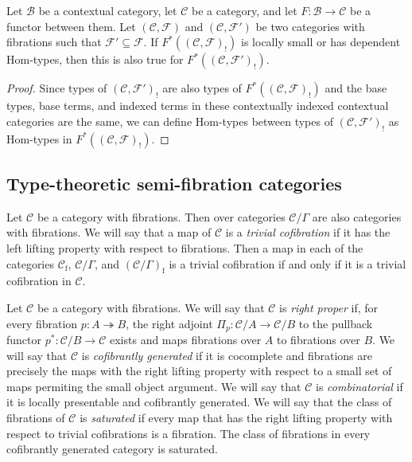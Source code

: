 \documentclass[reqno]{amsart}
\theoremstyle{definition}
\theoremstyle{remark}
\newcommand{\fs}[1]{\mathrm{#1}}
\newcommand{\scat}[1]{\mathcal{#1}}
\newcommand{\Fib}{\mathcal{F}}
\newcommand{\Hom}{\fs{Hom}}
\numberwithin{figure}{section}
\begin{document}
\begin{prop}
Let $\scat{B}$ be a contextual category, let $\scat{C}$ be a category, and let $F : \scat{B} \to \scat{C}$ be a functor between them.
Let $(\scat{C},\Fib)$ and $(\scat{C},\Fib')$ be two categories with fibrations such that $\Fib' \subseteq \Fib$.
If $F^*((\scat{C},\Fib)_!)$ is locally small or has dependent $\Hom$-types, then this is also true for $F^*((\scat{C},\Fib')_!)$.
\end{prop}
\begin{proof}
Since types of $(\scat{C},\Fib')_!$ are also types of $F^*((\scat{C},\Fib)_!)$ and the base types, base terms, and indexed terms in these contextually indexed contextual categories are the same,
we can define $\Hom$-types between types of $(\scat{C},\Fib')_!$ as $\Hom$-types in $F^*((\scat{C},\Fib)_!)$.
\end{proof}

\subsection{Type-theoretic semi-fibration categories}

Let $\scat{C}$ be a category with fibrations.
Then over categories $\scat{C}/\Gamma$ are also categories with fibrations.
We will say that a map of $\scat{C}$ is a \emph{trivial cofibration} if it has the left lifting property with respect to fibrations.
Then a map in each of the categories $\scat{C}_\fs{f}$, $\scat{C}/\Gamma$, and $(\scat{C}/\Gamma)_\fs{f}$ is a trivial cofibration if and only if it is a trivial cofibration in $\scat{C}$.

Let $\scat{C}$ be a category with fibrations.
We will say that $\scat{C}$ is \emph{right proper} if, for every fibration $p : A \twoheadrightarrow B$, the right adjoint $\Pi_p : \scat{C}/A \to \scat{C}/B$ to the pullback functor $p^* : \scat{C}/B \to \scat{C}$ exists and maps fibrations over $A$ to fibrations over $B$.
We will say that $\scat{C}$ is \emph{cofibrantly generated} if it is cocomplete and fibrations are precisely the maps with the right lifting property with respect to a small set of maps permiting the small object argument.
We will say that $\scat{C}$ is \emph{combinatorial} if it is locally presentable and cofibrantly generated.
We will say that the class of fibrations of $\scat{C}$ is \emph{saturated} if every map that has the right lifting property with respect to trivial cofibrations is a fibration.
The class of fibrations in every cofibrantly generated category is saturated.
\end{document}
